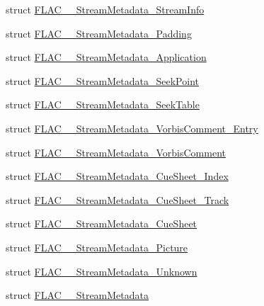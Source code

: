 \begin{DoxyCompactItemize}
\item 
struct \mbox{\hyperlink{struct_f_l_a_c_____stream_metadata___stream_info}{F\+L\+A\+C\+\_\+\+\_\+\+Stream\+Metadata\+\_\+\+Stream\+Info}}
\item 
struct \mbox{\hyperlink{struct_f_l_a_c_____stream_metadata___padding}{F\+L\+A\+C\+\_\+\+\_\+\+Stream\+Metadata\+\_\+\+Padding}}
\item 
struct \mbox{\hyperlink{struct_f_l_a_c_____stream_metadata___application}{F\+L\+A\+C\+\_\+\+\_\+\+Stream\+Metadata\+\_\+\+Application}}
\item 
struct \mbox{\hyperlink{struct_f_l_a_c_____stream_metadata___seek_point}{F\+L\+A\+C\+\_\+\+\_\+\+Stream\+Metadata\+\_\+\+Seek\+Point}}
\item 
struct \mbox{\hyperlink{struct_f_l_a_c_____stream_metadata___seek_table}{F\+L\+A\+C\+\_\+\+\_\+\+Stream\+Metadata\+\_\+\+Seek\+Table}}
\item 
struct \mbox{\hyperlink{struct_f_l_a_c_____stream_metadata___vorbis_comment___entry}{F\+L\+A\+C\+\_\+\+\_\+\+Stream\+Metadata\+\_\+\+Vorbis\+Comment\+\_\+\+Entry}}
\item 
struct \mbox{\hyperlink{struct_f_l_a_c_____stream_metadata___vorbis_comment}{F\+L\+A\+C\+\_\+\+\_\+\+Stream\+Metadata\+\_\+\+Vorbis\+Comment}}
\item 
struct \mbox{\hyperlink{struct_f_l_a_c_____stream_metadata___cue_sheet___index}{F\+L\+A\+C\+\_\+\+\_\+\+Stream\+Metadata\+\_\+\+Cue\+Sheet\+\_\+\+Index}}
\item 
struct \mbox{\hyperlink{struct_f_l_a_c_____stream_metadata___cue_sheet___track}{F\+L\+A\+C\+\_\+\+\_\+\+Stream\+Metadata\+\_\+\+Cue\+Sheet\+\_\+\+Track}}
\item 
struct \mbox{\hyperlink{struct_f_l_a_c_____stream_metadata___cue_sheet}{F\+L\+A\+C\+\_\+\+\_\+\+Stream\+Metadata\+\_\+\+Cue\+Sheet}}
\item 
struct \mbox{\hyperlink{struct_f_l_a_c_____stream_metadata___picture}{F\+L\+A\+C\+\_\+\+\_\+\+Stream\+Metadata\+\_\+\+Picture}}
\item 
struct \mbox{\hyperlink{struct_f_l_a_c_____stream_metadata___unknown}{F\+L\+A\+C\+\_\+\+\_\+\+Stream\+Metadata\+\_\+\+Unknown}}
\item 
struct \mbox{\hyperlink{struct_f_l_a_c_____stream_metadata}{F\+L\+A\+C\+\_\+\+\_\+\+Stream\+Metadata}}
\end{DoxyCompactItemize}
